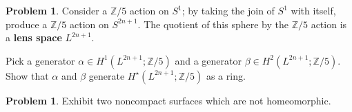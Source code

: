 \documentclass[12pt]{handout}
\theoremstyle{definition}
\newtheorem{problem}[theorem]{Problem}
\newcommand{\Z}{\mathbb{Z}}
\begin{document}
\begin{problem}
  Consider a $\Z/5$ action on $S^1$; by taking the join of $S^1$ with
  itself, produce a $\Z/5$ action on $S^{2n+1}$.  The quotient of this
  sphere by the $\Z/5$ action is a \textbf{lens space} $L^{2n+1}$.

  Pick a generator $\alpha \in H^1(L^{2n+1};\Z/5)$ and a generator $\beta \in
  H^2(L^{2n+1};\Z/5)$.  Show that $\alpha$ and $\beta$ generate $H^\star(L^{2n+1};\Z/5)$ as a ring.
\end{problem}

\begin{problem}
  Exhibit two noncompact surfaces which are not homeomorphic.
\end{problem}

\pagebreak
\null
\end{document}
